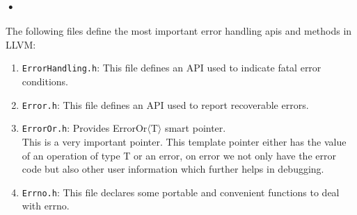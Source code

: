\documentclass[12pt]{article}
\begin{document}
\subsubsection*{•}
The following files define the most important error handling apis and methods in LLVM:
\begin{enumerate}
\item \texttt{ErrorHandling.h}: This file defines an API used to indicate fatal error conditions.
\item \texttt{Error.h}: This file defines an API used to report recoverable errors.
\item \texttt{ErrorOr.h}: Provides ErrorOr$\langle$T$\rangle$ smart pointer.\\
This is a very important pointer. This template pointer either has the value of an operation of type T or an error, on error we not only have the error code but also other user information which further helps in debugging.
\item \texttt{Errno.h}: This file declares some portable and convenient functions to deal with errno. 
\end{enumerate}
\end{document}
